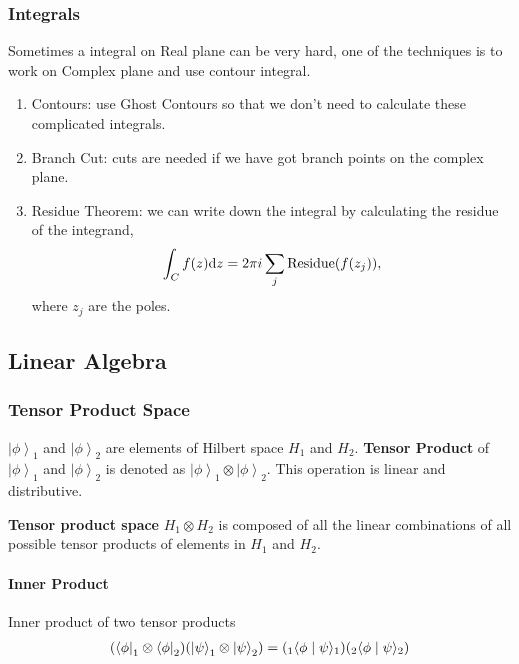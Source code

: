 \documentclass[letterpaper,10pt,english]{sphinxmanual}
\newcommand{\bra}[1]{\left\langle #1\right|}
\newcommand{\ket}[1]{\left| #1\right\rangle}
\newcommand{\braket}[2]{\langle #1 \mid #2 \rangle}
\begin{document}
\subsubsection{Integrals}
\label{math:integrals}
Sometimes a integral on Real plane can be very hard, one of the techniques is to work on Complex plane and use contour integral.
\begin{enumerate}
\item {} 
Contours: use Ghost Contours so that we don't need to calculate these complicated integrals.

\item {} 
Branch Cut: cuts are needed if we have got branch points on the complex plane.

\item {} 
Residue Theorem: we can write down the integral by calculating the residue of the integrand,
\begin{gather}
\begin{split}\int_C f(z) \mathrm dz = 2\pi i \sum_j \text{Residue}(f(z_j)),\end{split}\notag
\end{gather}
where \(z_j\) are the poles.

\end{enumerate}


\subsection{Linear Algebra}
\label{math:linear-algebra}

\subsubsection{Tensor Product Space}
\label{math:tensorproductspace}\label{math:tensor-product-space}
\(\ket{\phi}_1\) and \(\ket{\phi}_2\) are elements of Hilbert space \(H_1\) and \(H_2\). \textbf{Tensor Product} of \(\ket{\phi}_1\) and \(\ket{\phi}_2\) is denoted as \(\ket{\phi}_1\otimes \ket{\phi}_2\). This operation is linear and distributive.

\textbf{Tensor product space} \(H_1\otimes H_2\) is composed of all the linear combinations of all possible tensor products of elements in \(H_1\) and \(H_2\).


\paragraph{Inner Product}
\label{math:inner-product}
Inner product of two tensor products
\begin{gather}
\begin{split}(\bra{\phi}_1\otimes \bra{\phi}_2)(\ket{\psi}_1\otimes \ket{\psi}_2) = ( {} _ 1 \braket{\phi}{\psi}_1)({}_2\braket{\phi}{\psi}_2)\end{split}\notag
\end{gather}
\end{document}
